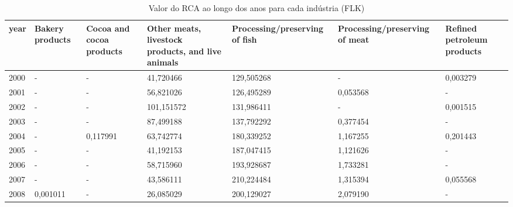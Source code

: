 \begin{table}
\centering
\caption{Valor do RCA ao longo dos anos para cada indústria (FLK)}
\begin{tabular}{p{1cm}p{2cm}p{2cm}p{2cm}p{2cm}p{2cm}p{2cm}}
\toprule
 year &  Bakery products &  Cocoa and cocoa products &  Other meats, livestock products, and live animals &  Processing/preserving of fish &  Processing/preserving of meat &  Refined petroleum products \\
\midrule
 2000 &                - &                         - &                                          41,720466 &                     129,505268 &                              - &                    0,003279 \\
 2001 &                - &                         - &                                          56,821026 &                     126,495289 &                       0,053568 &                           - \\
 2002 &                - &                         - &                                         101,151572 &                     131,986411 &                              - &                    0,001515 \\
 2003 &                - &                         - &                                          87,499188 &                     137,792292 &                       0,377454 &                           - \\
 2004 &                - &                  0,117991 &                                          63,742774 &                     180,339252 &                       1,167255 &                    0,201443 \\
 2005 &                - &                         - &                                          41,192153 &                     187,047415 &                       1,121626 &                           - \\
 2006 &                - &                         - &                                          58,715960 &                     193,928687 &                       1,733281 &                           - \\
 2007 &                - &                         - &                                          43,586111 &                     210,224484 &                       1,315394 &                    0,055568 \\
 2008 &         0,001011 &                         - &                                          26,085029 &                     200,129027 &                       2,079190 &                           - \\

\end{tabular}
\end{table}
